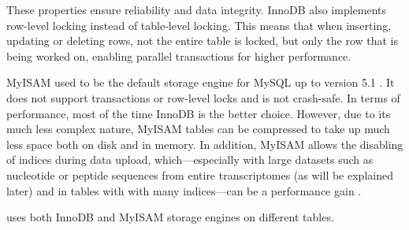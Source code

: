 These properties ensure reliability and data integrity. InnoDB also implements
row-level locking instead of table-level locking. This means that when
inserting, updating or deleting rows, not the entire table is locked, but only
the row that is being worked on, enabling parallel transactions for higher
performance. 

MyISAM used to be the default storage engine for MySQL up to version 5.1
\citep{schwartz2012}. It does not support transactions or row-level locks and is
not crash-safe. In terms of performance, most of the time InnoDB is the better
choice. However, due to its much less complex nature, MyISAM tables can be
compressed to take up much less space both on disk and in memory. In addition,
MyISAM allows the disabling of indices during data upload, which---especially
with large datasets such as nucleotide or peptide sequences from entire
transcriptomes (as will be explained later) and in tables with with many
indices---can be a performance gain \citep{mysql2013}. 

\pname uses both InnoDB and MyISAM storage engines on different tables.
